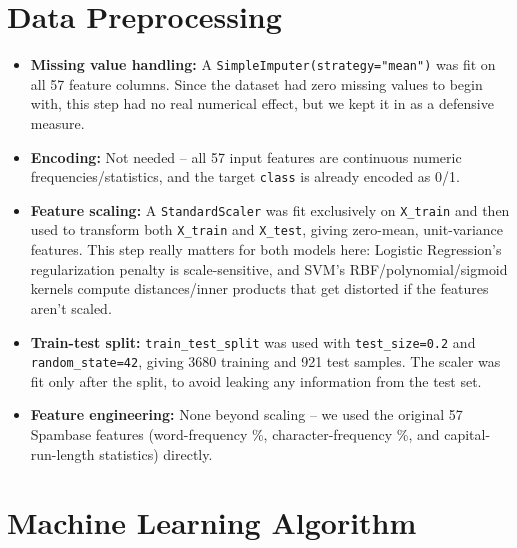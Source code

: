\documentclass[12pt,a4paper]{article}
\begin{document}
\section{Data Preprocessing}
 
\begin{itemize}
\item \textbf{Missing value handling:} A \texttt{SimpleImputer(strategy="mean")} was
fit on all 57 feature columns. Since the dataset had zero missing values to begin
with, this step had no real numerical effect, but we kept it in as a defensive
measure.
\item \textbf{Encoding:} Not needed -- all 57 input features are continuous numeric
frequencies/statistics, and the target \texttt{class} is already encoded as 0/1.
\item \textbf{Feature scaling:} A \texttt{StandardScaler} was fit exclusively on
\texttt{X\_train} and then used to transform both \texttt{X\_train} and
\texttt{X\_test}, giving zero-mean, unit-variance features. This step really matters
for both models here: Logistic Regression's regularization penalty is scale-sensitive,
and SVM's RBF/polynomial/sigmoid kernels compute distances/inner products that get
distorted if the features aren't scaled.
\item \textbf{Train-test split:} \texttt{train\_test\_split} was used with
\texttt{test\_size=0.2} and \texttt{random\_state=42}, giving 3680 training and 921
test samples. The scaler was fit only after the split, to avoid leaking any
information from the test set.
\item \textbf{Feature engineering:} None beyond scaling -- we used the original 57
Spambase features (word-frequency \%, character-frequency \%, and capital-run-length
statistics) directly.
\end{itemize}
 
\section{Machine Learning Algorithm}
 
\end{document}
